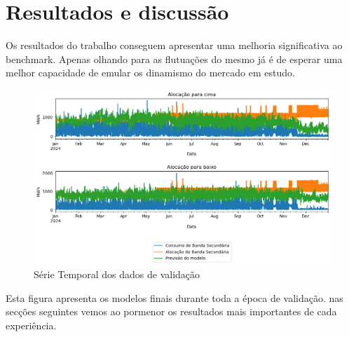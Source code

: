 \chapter{Resultados e discussão}

Os resultados do trabalho conseguem apresentar uma melhoria significativa ao benchmark. Apenas olhando para as flutuações do mesmo já é de esperar uma melhor capacidade de emular os dinamismo do mercado em estudo.\par

\begin{figure}[H]
    \centering
    \includegraphics[width=\textwidth]{plots/alocacoes_finais.png}
    \caption{Série Temporal dos dados de validação}
    \label{fig:modeltimeseries}
\end{figure}

Esta figura apresenta os modelos finais durante toda a época de validação. nas secções seguintes vemos ao pormenor os resultados mais importantes de cada experiência.\par

\thispagestyle{plain}


\thispagestyle{plain}

